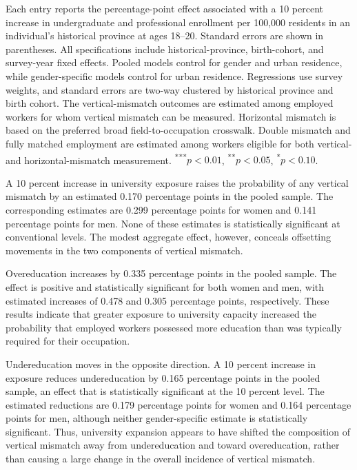 \begin{table}[htbp]
\begin{threeparttable}
\begin{tablenotes}[flushleft]
    \item Each entry reports the percentage-point effect associated with a 10 percent increase in undergraduate and professional enrollment per 100,000 residents in an individual's historical province at ages 18--20. Standard errors are shown in parentheses. All specifications include historical-province, birth-cohort, and survey-year fixed effects. Pooled models control for gender and urban residence, while gender-specific models control for urban residence. Regressions use survey weights, and standard errors are two-way clustered by historical province and birth cohort. The vertical-mismatch outcomes are estimated among employed workers for whom vertical mismatch can be measured. Horizontal mismatch is based on the preferred broad field-to-occupation crosswalk. Double mismatch and fully matched employment are estimated among workers eligible for both vertical- and horizontal-mismatch measurement. \textsuperscript{***}$p<0.01$, \textsuperscript{**}$p<0.05$, \textsuperscript{*}$p<0.10$.
  \end{tablenotes}
  \end{threeparttable}
\end{table}

A 10 percent increase in university exposure raises the probability of any vertical mismatch by an estimated 0.170 percentage points in the pooled sample. The corresponding estimates are 0.299 percentage points for women and 0.141 percentage points for men. None of these estimates is statistically significant at conventional levels. The modest aggregate effect, however, conceals offsetting movements in the two components of vertical mismatch.

Overeducation increases by 0.335 percentage points in the pooled sample. The effect is positive and statistically significant for both women and men, with estimated increases of 0.478 and 0.305 percentage points, respectively. These results indicate that greater exposure to university capacity increased the probability that employed workers possessed more education than was typically required for their occupation.

Undereducation moves in the opposite direction. A 10 percent increase in exposure reduces undereducation by 0.165 percentage points in the pooled sample, an effect that is statistically significant at the 10 percent level. The estimated reductions are 0.179 percentage points for women and 0.164 percentage points for men, although neither gender-specific estimate is statistically significant. Thus, university expansion appears to have shifted the composition of vertical mismatch away from undereducation and toward overeducation, rather than causing a large change in the overall incidence of vertical mismatch.

